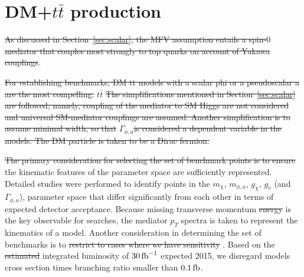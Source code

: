 
\section{DM+$t\bar{t}$ production}
\label{sec:ttdm}

\sout{As discussed in Section~\ref{sec:scalar}, the MFV assumption entails a spin-$0$ mediator that couples most strongly to top quarks on account of Yukawa couplings}.

\sout{ For establishing benchmarks, DM tt models with a scalar phi or a pseudoscalar a are the most compelling.}
$t\bar{t}$
\sout{The simplifications mentioned in Section~\ref{sec:scalar} are followed; namely, coupling of the mediator to SM Higgs are not considered and universal SM-mediator couplings are assumed. Another simplification is to assume minimal width, so that }$\Gamma_{\phi,a}$\sout{is considered a dependent variable in the models. The DM particle is taken to be a Dirac fermion.}

 \sout{The primary consideration for selecting the set of benchmark points is to ensure} the kinematic features of the parameter space are sufficiently represented. Detailed studies were performed to identify points in the $m_{\chi}$, $m_{\phi,a}$, $g_{\chi}$, $g_{v}$ (and $\Gamma_{\phi,a}$), parameter space that differ significantly from each other in terms of expected detector acceptance. Because missing \hto transverse momentum \sout{energy} is the key observable for searches, the mediator $p_{T}$ spectra is taken to represent the  kinematics of a model. Another consideration in determining the set of benchmarks is to \sout{restrict to cases  where we have sensitivity} . Based on the \sout{estimated}  integrated luminosity of $30\,{\rm fb}^{-1}$ expected  2015, we disregard models  cross section times branching ratio smaller than $0.1\,{\rm fb}$.

